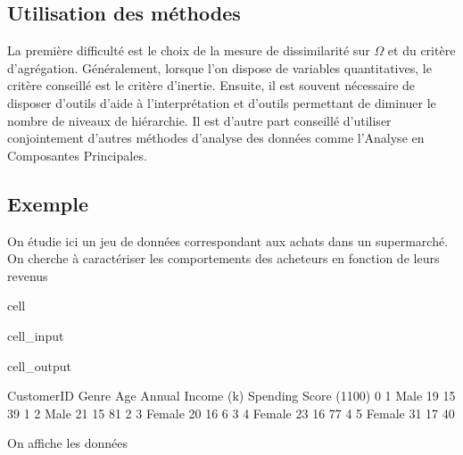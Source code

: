 \documentclass[letterpaper,10pt,english]{jupyterBook}
\begin{document}
\subsection{Utilisation des méthodes}
\label{\detokenize{clustering:utilisation-des-methodes}}
\sphinxAtStartPar
La première difficulté est le choix de la mesure de dissimilarité sur  \(\Omega\) et du critère d’agrégation. Généralement, lorsque l’on dispose de variables quantitatives, le critère conseillé est le critère d’inertie. Ensuite, il est souvent nécessaire de disposer d’outils d’aide à l’interprétation et d’outils permettant de diminuer le nombre de niveaux de hiérarchie. Il est d’autre part conseillé d’utiliser conjointement d’autres méthodes d’analyse des données comme l’Analyse en Composantes Principales.


\subsection{Exemple}
\label{\detokenize{clustering:exemple}}
\sphinxAtStartPar
On étudie ici un jeu de données correspondant aux achats dans un supermarché. On cherche à caractériser les comportements des acheteurs en fonction de leurs revenus

\begin{sphinxuseclass}{cell}\begin{sphinxVerbatimInput}

\begin{sphinxuseclass}{cell_input}
\begin{sphinxVerbatim}[commandchars=\\\{\}]
   
  
\end{sphinxVerbatim}

\end{sphinxuseclass}\end{sphinxVerbatimInput}
\begin{sphinxVerbatimOutput}

\begin{sphinxuseclass}{cell_output}
\begin{sphinxVerbatim}[commandchars=\\\{\}]
   CustomerID   Genre  Age  Annual Income (k\PYGZdl{})  Spending Score (1\PYGZhy{}100)
0           1    Male   19                  15                      39
1           2    Male   21                  15                      81
2           3  Female   20                  16                       6
3           4  Female   23                  16                      77
4           5  Female   31                  17                      40
\end{sphinxVerbatim}

\end{sphinxuseclass}\end{sphinxVerbatimOutput}

\end{sphinxuseclass}
\sphinxAtStartPar
On affiche les données
\end{document}
